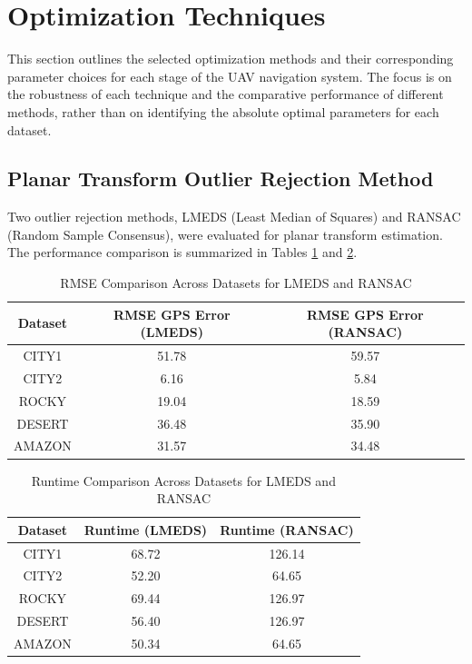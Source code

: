 \section{Optimization Techniques}

This section outlines the selected optimization methods and their corresponding parameter choices for each stage of the UAV navigation system. The focus is on the robustness of each technique and the comparative performance of different methods, rather than on identifying the absolute optimal parameters for each dataset.

\subsection{Planar Transform Outlier Rejection Method}

Two outlier rejection methods, LMEDS (Least Median of Squares) and RANSAC (Random Sample Consensus), were evaluated for planar transform estimation. The performance comparison is summarized in Tables \ref{tab:rmse_comparison_opt} and \ref{tab:runtime_comparison_opt}.

\begin{table}[H]
    \centering
    \caption{RMSE Comparison Across Datasets for LMEDS and RANSAC}
    \label{tab:rmse_comparison_opt}
    \begin{tabular}{|c|c|c|}
    \hline
    \textbf{Dataset} & \textbf{RMSE GPS Error (LMEDS)} & \textbf{RMSE GPS Error (RANSAC)} \\ \hline
    CITY1   & 51.78 & 59.57 \\ \hline
    CITY2   & 6.16  & 5.84  \\ \hline
    ROCKY   & 19.04 & 18.59 \\ \hline
    DESERT  & 36.48 & 35.90 \\ \hline
    AMAZON  & 31.57 & 34.48 \\ \hline
    \end{tabular}
\end{table}

\begin{table}[H]
    \centering
    \caption{Runtime Comparison Across Datasets for LMEDS and RANSAC}
    \label{tab:runtime_comparison_opt}
    \begin{tabular}{|c|c|c|}
    \hline
    \textbf{Dataset} & \textbf{Runtime (LMEDS)} & \textbf{Runtime (RANSAC)} \\ \hline
    CITY1   & 68.72 & 126.14 \\ \hline
    CITY2   & 52.20 & 64.65  \\ \hline
    ROCKY   & 69.44 & 126.97 \\ \hline
    DESERT  & 56.40 & 126.97 \\ \hline
    AMAZON  & 50.34 & 64.65  \\ \hline
    \end{tabular}
\end{table}

